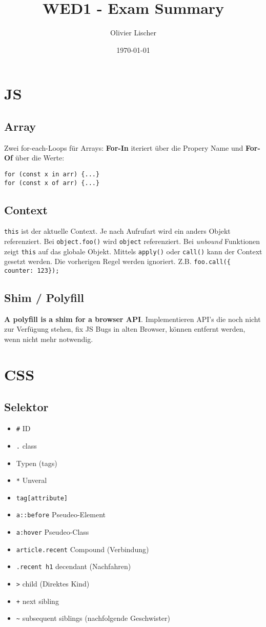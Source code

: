 \documentclass[11pt,twoside,landscape]{article}
\author{Olivier Lischer}
\date{\today}
\title{WED1 - Exam Summary}
\begin{document}
\begin{multicols*}{3}

  \section{JS}
  \subsection{Array}
  Zwei for-each-Loops für Arrays: \textbf{For-In} iteriert über die Propery Name und \textbf{For-Of} über die Werte:

\begin{verbatim}
for (const x in arr) {...}
for (const x of arr) {...}
\end{verbatim}

  \subsection{Context}
\verb+this+ ist der aktuelle Context. Je nach Aufrufart wird ein anders Objekt referenziert. Bei \verb+object.foo()+ wird \verb+object+ referenziert. Bei \emph{unbound} Funktionen zeigt \verb+this+ auf das globale Objekt. Mittels \verb+apply()+ oder \verb+call()+ kann der Context gesetzt werden. Die vorherigen Regel werden ignoriert. Z.B. \verb+foo.call({ counter: 123});+



\subsection{Shim / Polyfill}
\textbf{A polyfill is a shim for a browser API}. Implementieren API's die noch nicht zur Verfügung stehen, fix JS Bugs in alten Browser, können entfernt werden, wenn nicht mehr notwendig.

\section{CSS}
\subsection{Selektor}

\begin{itemize}
\item \verb+#+ ID
\item \verb+.+ class
\item Typen (tags)
\item \verb+*+ Unveral
\item \verb+tag[attribute]+
\item \verb+a::before+ Pseudeo-Element
\item \verb+a:hover+ Pseudeo-Class
\item \verb+article.recent+ Compound (Verbindung)
\item \verb+.recent h1+ decendant (Nachfahren)
\item \verb+>+ child (Direktes Kind)
\item \verb|+| next sibling
\item \verb+~+ subsequent siblings (nachfolgende Geschwister)
\end{itemize}


\end{multicols*}
\end{document}

